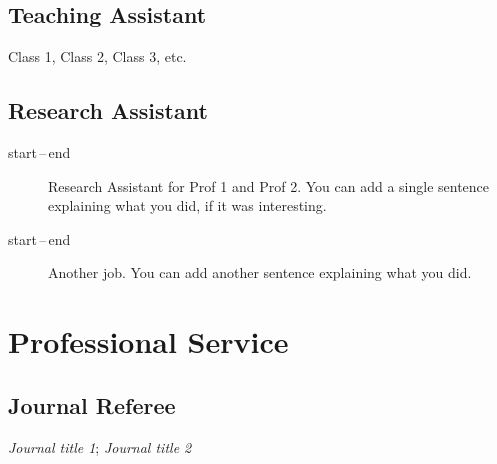 \documentclass[12pt]{safecv}%
\begin{document}
\subsection*{Teaching Assistant}
Class 1, Class 2, Class 3, etc.

\subsection*{Research Assistant}
\begin{description}
\item[start\,--\,end] Research Assistant for Prof 1 and Prof 2. You can
add a single sentence explaining what you did, if it was interesting.
\item[start\,--\,end] Another job. You can add another sentence
explaining what you did.
\end{description}

\section*{Professional Service}

\subsection*{Journal Referee}
\textit{Journal title 1};
\textit{Journal title 2}

\end{document}
